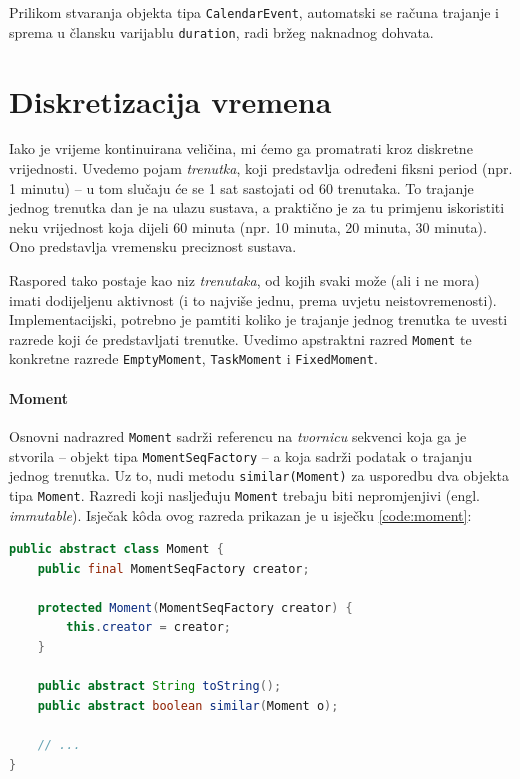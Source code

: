 \documentclass[times, utf8, zavrsni]{fer}
\begin{document}
Prilikom stvaranja objekta tipa \texttt{CalendarEvent}, automatski se računa trajanje i sprema u člansku varijablu \texttt{duration}, radi bržeg naknadnog dohvata.

\section{Diskretizacija vremena}\label{diskretizacija vremena}
Iako je vrijeme kontinuirana veličina, mi ćemo ga promatrati kroz diskretne vrijednosti. Uvedemo pojam \textit{trenutka}, koji predstavlja određeni fiksni period (npr. 1 minutu) -- u tom slučaju će se 1 sat sastojati od 60 trenutaka. To trajanje jednog trenutka dan je na ulazu sustava, a praktično je za tu primjenu iskoristiti neku vrijednost koja dijeli 60 minuta (npr. 10 minuta, 20 minuta, 30 minuta). Ono predstavlja vremensku preciznost sustava.

Raspored tako postaje kao niz \textit{trenutaka}, od kojih svaki može (ali i ne mora) imati dodijeljenu aktivnost (i to najviše jednu, prema uvjetu neistovremenosti). Implementacijski, potrebno je pamtiti koliko je trajanje jednog trenutka te uvesti razrede koji će predstavljati trenutke. Uvedimo apstraktni razred \texttt{Moment} te konkretne razrede \texttt{EmptyMoment}, \texttt{TaskMoment} i \texttt{FixedMoment}.

\paragraph{Moment} Osnovni nadrazred \texttt{Moment} sadrži referencu na \textit{tvornicu} sekvenci koja ga je stvorila -- objekt tipa \texttt{MomentSeqFactory} -- a koja sadrži podatak o trajanju jednog trenutka. Uz to, nudi metodu \texttt{similar(Moment)} za usporedbu dva objekta tipa \texttt{Moment}.  Razredi koji nasljeđuju \texttt{Moment} trebaju biti nepromjenjivi (engl. \textit{immutable}). Isječak k\^{o}da ovog razreda prikazan je u isječku \ref{code:moment}:

\begin{lstlisting}[language=java, caption=Apstraktni razred Moment, label={code:moment}]
public abstract class Moment {
    public final MomentSeqFactory creator;

    protected Moment(MomentSeqFactory creator) {
        this.creator = creator;
    }

    public abstract String toString();
    public abstract boolean similar(Moment o);
    
    // ...
}
\end{lstlisting}
\end{document}
